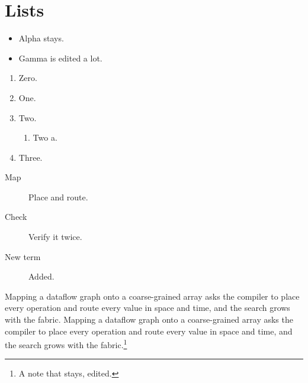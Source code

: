\documentclass{article}
\begin{document}
\section{Lists}
\begin{itemize}
\item Alpha stays.
\item Gamma is edited a lot.
\end{itemize}
\begin{enumerate}
\item Zero.
\item One.
\item Two.
\begin{enumerate}
\item Two a.
\end{enumerate}
\item Three.
\end{enumerate}
\begin{description}
\item[Map] Place and route.
\item[Check] Verify it twice.
\item[New term] Added.
\end{description}
Mapping a dataflow graph onto a coarse-grained array asks the compiler to place every operation and route every value in space and time, and the search grows with the fabric. Mapping a dataflow graph onto a coarse-grained array asks the compiler to place every operation and route every value in space and time, and the search grows with the fabric.\footnote{A note that stays, edited.}
\end{document}
